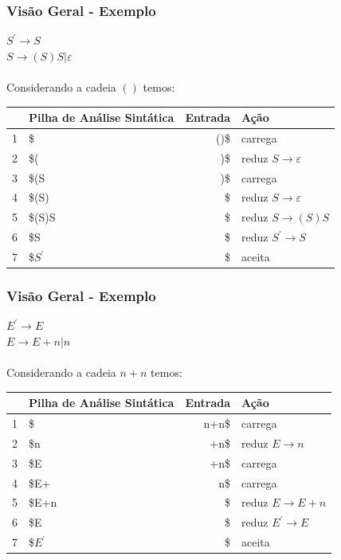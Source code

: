 \documentclass[table]{beamer}
\begin{document}
\begin{frame}
   \frametitle{Visão Geral - Exemplo}
   $S^{'}\to S$ \\
   $S\to(S)S|\varepsilon$ \\
   \\
   Considerando a cadeia $()$ temos:

   \begin{table}
      \begin{tabular}{|c|l|r|l|}
      \hline
      & Pilha de Análise Sintática & Entrada & Ação \\
      \hline 
      1 & \$        & ()\$ & carrega                         \\
      2 & \$(       &  )\$ & reduz $S\to\varepsilon$         \\
      3 & \$(S      &  )\$ & carrega                         \\
      4 & \$(S)     &   \$ & reduz $S\to\varepsilon$         \\
      5 & \$(S)S    &   \$ & reduz $S\to(S)S$                \\
      6 & \$S       &   \$ & reduz $S^{'}\to S$              \\
      7 & \$$S^{'}$ &   \$ & aceita                          \\
      \hline
      \end{tabular}
   \end{table}
\end{frame}

\begin{frame}
   \frametitle{Visão Geral - Exemplo}
   $E^{'}\to E$ \\
   $E\to E+n|n$ \\
   \\
   Considerando a cadeia $n+n$ temos:

   \begin{table}
      \begin{tabular}{|c|l|r|l|}
      \hline
      & Pilha de Análise Sintática & Entrada & Ação \\
      \hline 
      1 & \$        & n+n\$ & carrega                         \\
      2 & \$n       &  +n\$ & reduz $E\to n$         \\
      3 & \$E       &  +n\$ & carrega                         \\
      4 & \$E+      &   n\$ & carrega   \\
      5 & \$E+n     &    \$ & reduz $E\to E + n$                \\
      6 & \$E       &    \$ & reduz $E^{'}\to E$              \\
      7 & \$$E^{'}$ &    \$ & aceita                          \\
      \hline
      \end{tabular}
   \end{table}
\end{frame}
\end{document}
